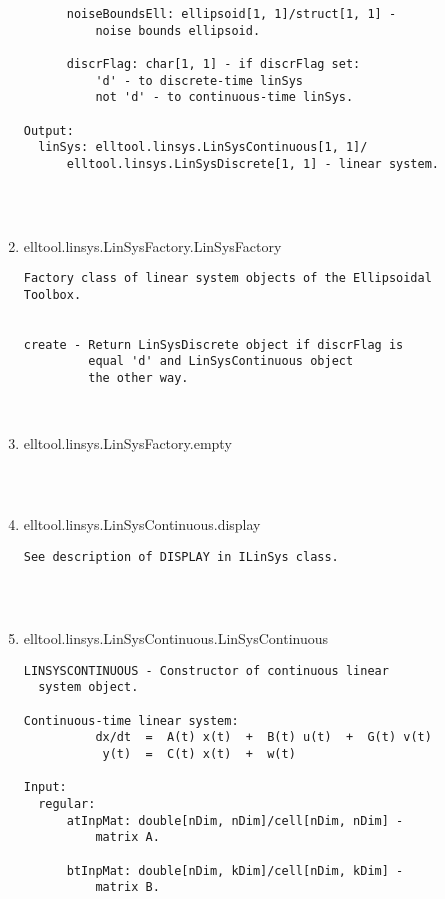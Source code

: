 \begin{enumerate}
\begin{lstlisting}
      noiseBoundsEll: ellipsoid[1, 1]/struct[1, 1] -
          noise bounds ellipsoid.

      discrFlag: char[1, 1] - if discrFlag set:
          'd' - to discrete-time linSys
          not 'd' - to continuous-time linSys.

Output:
  linSys: elltool.linsys.LinSysContinuous[1, 1]/
      elltool.linsys.LinSysDiscrete[1, 1] - linear system.




\end{lstlisting}
\fontfamily{\familydefault}
\selectfont
\item {elltool.linsys.LinSysFactory.LinSysFactory}
\selectfont
\begin{lstlisting}
Factory class of linear system objects of the Ellipsoidal
Toolbox.


create - Return LinSysDiscrete object if discrFlag is
         equal 'd' and LinSysContinuous object
         the other way.



\end{lstlisting}
\fontfamily{\familydefault}
\selectfont
\item {elltool.linsys.LinSysFactory.empty}
\selectfont
\begin{lstlisting}



\end{lstlisting}
\fontfamily{\familydefault}
\selectfont
\item {elltool.linsys.LinSysContinuous.display}
\selectfont
\begin{lstlisting}
See description of DISPLAY in ILinSys class.




\end{lstlisting}
\fontfamily{\familydefault}
\selectfont
\item {elltool.linsys.LinSysContinuous.LinSysContinuous}
\selectfont
\begin{lstlisting}
LINSYSCONTINUOUS - Constructor of continuous linear
  system object.

Continuous-time linear system:
          dx/dt  =  A(t) x(t)  +  B(t) u(t)  +  G(t) v(t)
           y(t)  =  C(t) x(t)  +  w(t)

Input:
  regular:
      atInpMat: double[nDim, nDim]/cell[nDim, nDim] -
          matrix A.

      btInpMat: double[nDim, kDim]/cell[nDim, kDim] -
          matrix B.


\end{lstlisting}
\end{enumerate}
